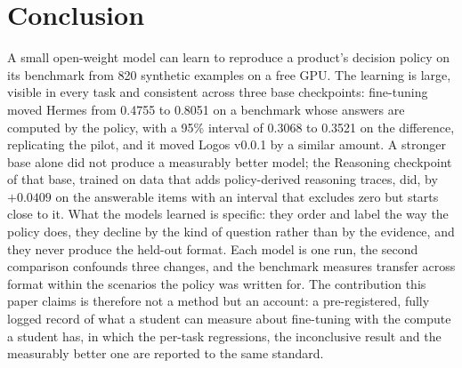 \section{Conclusion}
A small open-weight model can learn to reproduce a product's decision policy on its benchmark from 820 synthetic examples on a free GPU. The learning is large, visible in every task and consistent across three base checkpoints: fine-tuning moved Hermes from 0.4755 to 0.8051 on a benchmark whose answers are computed by the policy, with a 95\% interval of 0.3068 to 0.3521 on the difference, replicating the pilot, and it moved Logos v0.0.1 by a similar amount. A stronger base alone did not produce a measurably better model; the Reasoning checkpoint of that base, trained on data that adds policy-derived reasoning traces, did, by $+0.0409$ on the answerable items with an interval that excludes zero but starts close to it. What the models learned is specific: they order and label the way the policy does, they decline by the kind of question rather than by the evidence, and they never produce the held-out format. Each model is one run, the second comparison confounds three changes, and the benchmark measures transfer across format within the scenarios the policy was written for. The contribution this paper claims is therefore not a method but an account: a pre-registered, fully logged record of what a student can measure about fine-tuning with the compute a student has, in which the per-task regressions, the inconclusive result and the measurably better one are reported to the same standard.
